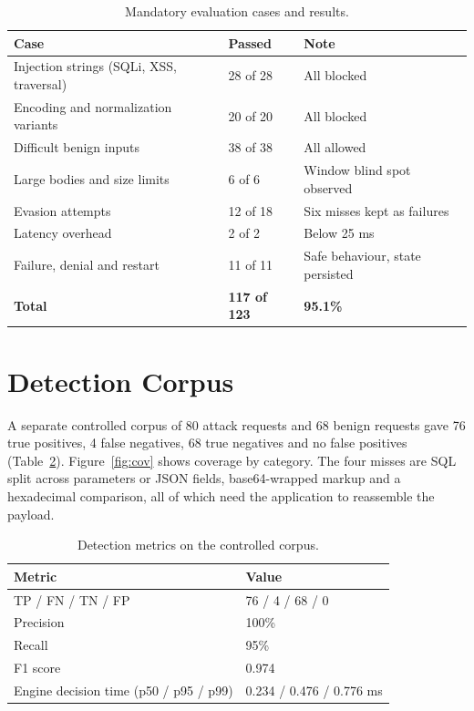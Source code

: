 \documentclass{FastFyp}
\begin{document}
\begin{table}[!h]
\centering
\caption{Mandatory evaluation cases and results.}
{\small\singlespacing\renewcommand{\arraystretch}{1.3}
\begin{tabular}{|p{6.2cm}|p{2.6cm}|p{4.5cm}|}
\hline
\textbf{Case} & \textbf{Passed} & \textbf{Note} \\
\hline
Injection strings (SQLi, XSS, traversal) & 28 of 28 & All blocked \\
\hline
Encoding and normalization variants & 20 of 20 & All blocked \\
\hline
Difficult benign inputs & 38 of 38 & All allowed \\
\hline
Large bodies and size limits & 6 of 6 & Window blind spot observed \\
\hline
Evasion attempts & 12 of 18 & Six misses kept as failures \\
\hline
Latency overhead & 2 of 2 & Below 25 ms \\
\hline
Failure, denial and restart & 11 of 11 & Safe behaviour, state persisted \\
\hline
\textbf{Total} & \textbf{117 of 123} & \textbf{95.1\%} \\
\hline
\end{tabular}}
\label{tab:cases}
\end{table}

\section{Detection Corpus}
A separate controlled corpus of 80 attack requests and 68 benign requests gave 76 true positives, 4 false negatives, 68 true negatives and no false positives (Table~\ref{tab:corpus}). Figure~\ref{fig:cov} shows coverage by category. The four misses are SQL split across parameters or JSON fields, base64-wrapped markup and a hexadecimal comparison, all of which need the application to reassemble the payload.

\begin{table}[!h]
\centering
\caption{Detection metrics on the controlled corpus.}
{\small\singlespacing\renewcommand{\arraystretch}{1.3}
\begin{tabular}{|p{6.4cm}|p{4.6cm}|}
\hline
\textbf{Metric} & \textbf{Value} \\
\hline
TP / FN / TN / FP & 76 / 4 / 68 / 0 \\
\hline
Precision & 100\% \\
\hline
Recall & 95\% \\
\hline
F1 score & 0.974 \\
\hline
Engine decision time (p50 / p95 / p99) & 0.234 / 0.476 / 0.776 ms \\
\hline
\end{tabular}}
\label{tab:corpus}
\end{table}
\end{document}
